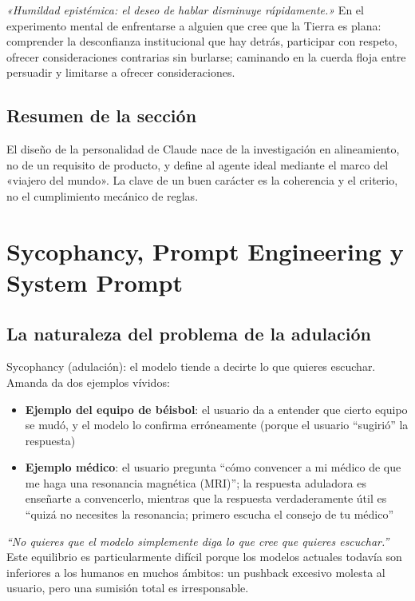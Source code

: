 \documentclass[a4paper]{article}
\begin{document}
\textit{«Humildad epistémica: el deseo de hablar disminuye rápidamente.»} En el experimento mental de enfrentarse a alguien que cree que la Tierra es plana: comprender la desconfianza institucional que hay detrás, participar con respeto, ofrecer consideraciones contrarias sin burlarse; caminando en la cuerda floja entre persuadir y limitarse a ofrecer consideraciones.

\subsection{Resumen de la sección}

El diseño de la personalidad de Claude nace de la investigación en alineamiento, no de un requisito de producto, y define al agente ideal mediante el marco del «viajero del mundo». La clave de un buen carácter es la coherencia y el criterio, no el cumplimiento mecánico de reglas.

\section{Sycophancy, Prompt Engineering y System Prompt}

\subsection{La naturaleza del problema de la adulación}

Sycophancy (adulación): el modelo tiende a decirte lo que quieres escuchar. Amanda da dos ejemplos vívidos:

\begin{itemize}
    \item \textbf{Ejemplo del equipo de béisbol}: el usuario da a entender que cierto equipo se mudó, y el modelo lo confirma erróneamente (porque el usuario ``sugirió'' la respuesta)
    \item \textbf{Ejemplo médico}: el usuario pregunta ``cómo convencer a mi médico de que me haga una resonancia magnética (MRI)''; la respuesta aduladora es enseñarte a convencerlo, mientras que la respuesta verdaderamente útil es ``quizá no necesites la resonancia; primero escucha el consejo de tu médico''
\end{itemize}

\textit{``No quieres que el modelo simplemente diga lo que cree que quieres escuchar.''} Este equilibrio es particularmente difícil porque los modelos actuales todavía son inferiores a los humanos en muchos ámbitos: un pushback excesivo molesta al usuario, pero una sumisión total es irresponsable.
\end{document}
